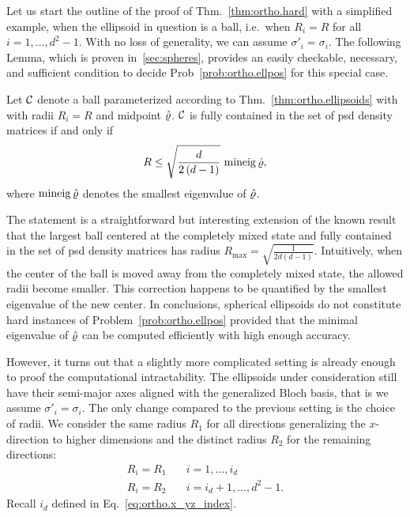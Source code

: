Let us start the outline of the proof of Thm.~\ref{thm:ortho.hard} with a simplified example, when the ellipsoid in question is a ball, i.e.\ when $R_{i}=R$ for all $i=1,\ldots,d^{2}-1$.
With no loss of generality, we can assume $\sigma'_i = \sigma_i$.
The following Lemma, which is proven in~\ref{sec:spheres}, provides an easily checkable, necessary, and sufficient condition to decide Prob~\ref{prob:ortho.ellpos} for this special case.
\begin{lemma}\label{lem:ortho.spheres}
  Let $\mathcal{C}$ denote a ball parameterized according to Thm.~\ref{thm:ortho.ellipsoids} with with radii $R_i=R$ and midpoint $\hat{\varrho}$.
  $\mathcal{C}$ is fully contained in the set of psd density matrices if and only if
  \[
    R\leq\sqrt{\frac{d}{2\left(d-1\right)}} \, \operatorname{mineig} \hat{\varrho},
  \]
  where $\operatorname{mineig}\hat{\varrho}$ denotes the smallest eigenvalue of $\hat{\varrho}$.
\end{lemma}
The statement is a straightforward but interesting extension of the known result that the largest ball centered at the completely mixed state and fully contained in the set of psd density matrices has radius $R_{\mathrm{max}}=\sqrt{\frac{1}{2d\left(d-1\right)}}$.
Intuitively, when the center of the ball is moved away from the completely mixed state, the allowed radii become smaller.
This correction happens to be quantified by the smallest eigenvalue of the new center.
In conclusions, spherical ellipsoids do not constitute hard instances of Problem~\ref{prob:ortho.ellpos} provided that the minimal eigenvalue of $\hat{\varrho}$ can be computed efficiently with high enough accuracy.

However, it turns out that a slightly more complicated setting is already enough to proof the computational intractability.
The ellipsoids under consideration still have their semi-major axes aligned with the generalized Bloch basis, that is we assume $\sigma'_i = \sigma_i$.
The only change compared to the previous setting is the choice of radii.
We consider the same radius $R_{1}$ for all directions generalizing the $x$-direction to higher dimensions and the distinct radius $R_{2}$ for the remaining directions:
\[
  \label{eq:ortho.subclass}
  \begin{split}
    R_{i}=R_{1} &\quad i=1,\ldots,i_{d}\\
    R_{i}=R_{2} &\quad i=i_{d}+1,\ldots,d^{2}-1.
  \end{split}
\]
Recall $i_d$ defined in Eq.~\eqref{eq:ortho.x_yz_index}.

